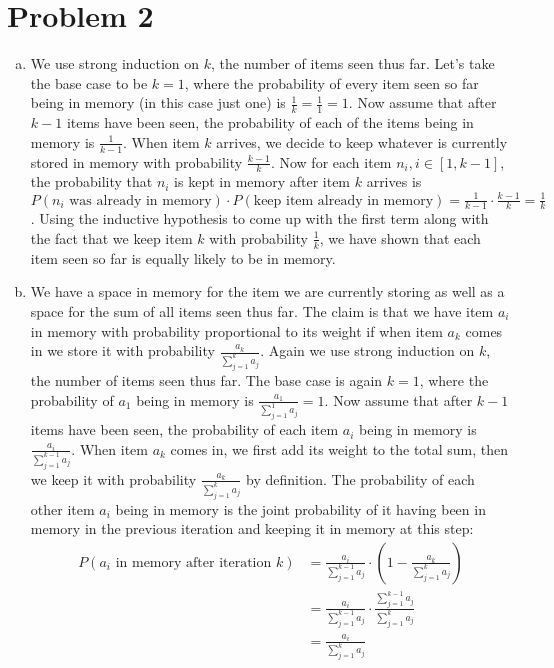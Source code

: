 \documentclass[11pt]{article}
\newcommand{\asdf}{\newline\newline}
\begin{document}
\section*{Problem 2}
\begin{enumerate}[(a)]
\item We use strong induction on $k$, the number of items seen thus far. Let's take the base case to be $k=1$, where the probability of every item seen so far being in memory (in this case just one) is $\frac1k = \frac11 = 1$. Now assume that after $k-1$ items have been seen, the probability of each of the items being in memory is $\frac1{k-1}$. When item $k$ arrives, we decide to keep whatever is currently stored in memory with probability $\frac{k-1}k$. Now for each item $n_i,i\in [1,k-1]$, the probability that $n_i$ is kept in memory after item $k$ arrives is $P(n_i\text{ was already in memory})\cdot P(\text{keep item already in memory}) = \frac1{k-1}\cdot\frac{k-1}k = \frac1k$. Using the inductive hypothesis to come up with the first term along with the fact that we keep item $k$ with probability $\frac1k$, we have shown that each item seen so far is equally likely to be in memory.
\item We have a space in memory for the item we are currently storing as well as a space for the sum of all items seen thus far. The claim is that we have item $a_i$ in memory with probability proportional to its weight if when item $a_k$ comes in we store it with probability $\frac{a_k}{\sum_{j=1}^k a_j}$.\asdf
Again we use strong induction on $k$, the number of items seen thus far. The base case is again $k=1$, where the probability of $a_1$ being in memory is $\frac{a_1}{\sum_{j=1}^1 a_j} = 1$. Now assume that after $k-1$ items have been seen, the probability of each item $a_i$ being in memory is $\frac{a_i}{\sum_{j=1}^{k-1} a_j}$. When item $a_k$ comes in, we first add its weight to the total sum, then we keep it with probability $\frac{a_k}{\sum_{j=1}^k a_j}$ by definition. The probability of each other item $a_i$ being in memory is the joint probability of it having been in memory in the previous iteration and keeping it in memory at this step:
\begin{align*}
P(a_i\text{ in memory after iteration }k) &= \frac{a_i}{\sum_{j=1}^{k-1} a_j}\cdot (1-\frac{a_k}{\sum_{j=1}^k a_j})\\
&= \frac{a_i}{\sum_{j=1}^{k-1} a_j}\cdot \frac{\sum_{j=1}^{k-1} a_j}{\sum_{j=1}^k a_j}\\
&= \frac{a_i}{\sum_{j=1}^k a_j}
\end{align*}
\end{enumerate}
\end{document}
